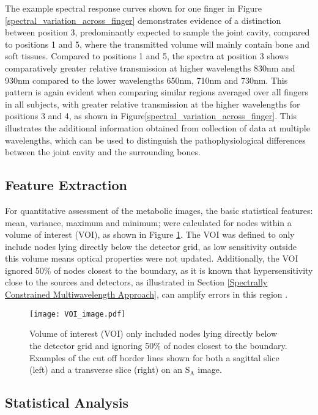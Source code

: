 \documentclass[twoside]{bhamthesis}
\theoremstyle{definition}
\begin{document}
The example spectral response curves shown for one finger in Figure \ref{spectral_variation_across_finger} demonstrates evidence of a distinction between position 3, predominantly expected to sample the joint cavity, compared to positions 1 and 5, where the transmitted volume will mainly contain bone and soft tissues. Compared to positions 1 and 5, the spectra at position 3 shows comparatively greater relative transmission at higher wavelengths 830nm and 930nm compared to the lower wavelengths 650nm, 710nm and 730nm. This pattern is again evident when comparing similar regions averaged over all fingers in all subjects, with greater relative transmission at the higher wavelengths for positions 3 and 4, as shown in Figure\ref{spectral_variation_across_finger}. This illustrates the additional information obtained from collection of data at multiple wavelengths, which can be used to distinguish the pathophysiological differences between the joint cavity and the surrounding bones.

\subsection{Feature Extraction} 
\label{Feature Extraction}
For quantitative assessment of the metabolic images, the basic statistical features: mean, variance, maximum and minimum; were calculated for nodes within a volume of interest (VOI), as shown in Figure \ref{VOI_image}. The VOI was defined to only include nodes lying directly below the detector grid, as low sensitivity outside this volume means optical properties were not updated. Additionally, the VOI ignored 50\% of nodes closest to the boundary, as it is known that hypersensitivity close to the sources and detectors, as illustrated in Section
\ref{Spectrally Constrained Multiwavelength Approach}, can amplify errors in this region \cite{boas2001simultaneous}. 

\begin{figure}[!ht]
\centering\texttt{[image: VOI\_image.pdf]}
\caption{Volume of interest (VOI) only included nodes lying directly below the detector grid and ignoring 50\% of nodes closest to the boundary. Examples of the cut off border lines shown for both a sagittal slice (left) and a transverse slice (right) on an $\mathrm{S_A}$ image.}
\label{VOI_image}
\end{figure}

\subsection{Statistical Analysis} 
\end{document}
